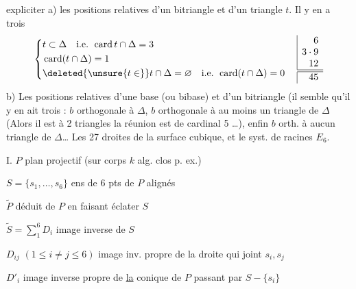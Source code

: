expliciter a) les positions relatives d'un bitriangle \inserted{$\Delta$} et d'un triangle $t$. Il y en a trois
\[
\left\{\begin{aligned}
&t\subset\Delta\quad\text{i.e. }\operatorname{card}t\cap\Delta=3\\
&\operatorname{card}(t\cap\Delta)=1\\
&\deleted{\unsure{t\in}}t\cap\Delta=\varnothing\quad\text{i.e. }\operatorname{card}(t\cap\Delta)=0
\end{aligned}\right.
\quad\begin{array}{|r}6\\3\cdot9\\12\\\hline\hline45\end{array}
\]
b) Les positions relatives d'une base (ou bibase) et d'un bitriangle (il semble qu'il y en ait trois : $b$ orthogonale à $\Delta$, $b$  orthogonale à au moins un triangle de $\Delta$ (Alors il est  à  2 triangles  la réunion est de cardinal 5 \ldots), enfin $b$ orth. à aucun triangle de $\Delta$\ldots
Les 27 droites de la surface cubique, et le syst. de racines $E_6$.

I. \quad $P$ plan projectif (sur corps $k$ alg. clos p. ex.)

$S=\{s_1,\ldots,s_6\}$ ens de 6 pts de $P$   alignés  

$\widetilde P$ déduit de $P$ en faisant éclater $S$

$\widetilde S=\sum_1^6D_i$ image inverse de $S$

$D_{ij}$ $(1\le i\ne j\le6)$ image inv. propre de la droite qui joint $s_i,s_j$

$D'_i$ image inverse propre de \uline{la} conique de $P$ passant par $S-\{s_i\}$

